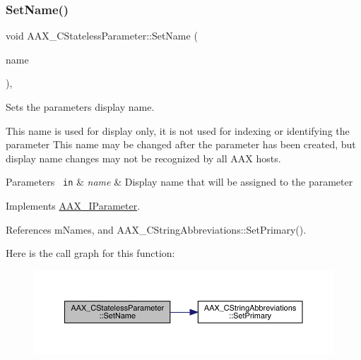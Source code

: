 \subsubsection{\texorpdfstring{SetName()}{SetName()}}
{\footnotesize\ttfamily void A\+A\+X\+\_\+\+C\+Stateless\+Parameter\+::\+Set\+Name (\begin{DoxyParamCaption}\item[{const \mbox{\hyperlink{a01573}{A\+A\+X\+\_\+\+C\+String}} \&}]{name }\end{DoxyParamCaption})\hspace{0.3cm}{\ttfamily [inline]}, {\ttfamily [virtual]}}



Sets the parameter\textquotesingle{}s display name. 

This name is used for display only, it is not used for indexing or identifying the parameter This name may be changed after the parameter has been created, but display name changes may not be recognized by all A\+AX hosts.


\begin{DoxyParams}[1]{Parameters}
\mbox{\texttt{ in}}  & {\em name} & Display name that will be assigned to the parameter \\
\hline
\end{DoxyParams}


Implements \mbox{\hyperlink{a01857_a480e9947cdaee6f26ca2bbaeb9de56b2}{A\+A\+X\+\_\+\+I\+Parameter}}.



References m\+Names, and A\+A\+X\+\_\+\+C\+String\+Abbreviations\+::\+Set\+Primary().

Here is the call graph for this function\+:
\nopagebreak
\begin{figure}[H]
\begin{center}
\leavevmode
\includegraphics[width=350pt]{a01541_ada71762c3254475a587047b50efbead5_cgraph}
\end{center}
\end{figure}
\mbox{\label{a01541_a191fc266252f440feca3f3138e706cb8}} 
